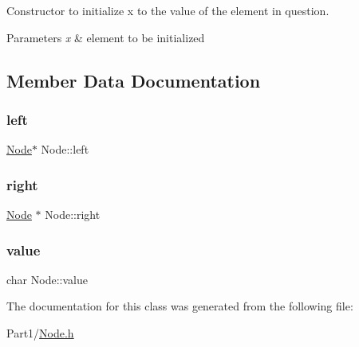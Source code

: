 Constructor to initialize x to the value of the element in question. 
\begin{DoxyParams}{Parameters}
{\em x} & element to be initialized \\
\hline
\end{DoxyParams}


\subsection{Member Data Documentation}
\mbox{\label{class_node_ab8c667ac8fdb120ed4c031682a9cdaee}} 
\subsubsection{\texorpdfstring{left}{left}}
{\footnotesize\ttfamily \mbox{\hyperlink{class_node}{Node}}$\ast$ Node\+::left}

\mbox{\label{class_node_afe5916d969cd32f7de1e4ba15580c989}} 
\subsubsection{\texorpdfstring{right}{right}}
{\footnotesize\ttfamily \mbox{\hyperlink{class_node}{Node}} $\ast$ Node\+::right}

\mbox{\label{class_node_a8935385009892a43bb92f31f17884179}} 
\subsubsection{\texorpdfstring{value}{value}}
{\footnotesize\ttfamily char Node\+::value}



The documentation for this class was generated from the following file\+:\begin{DoxyCompactItemize}
\item 
Part1/\mbox{\hyperlink{_node_8h}{Node.\+h}}\end{DoxyCompactItemize}
